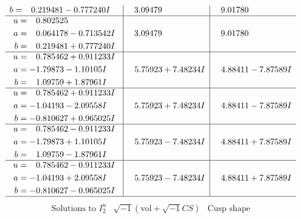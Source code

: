 \documentclass[1p]{elsarticle_modified}
\theoremstyle{definition}
\newcommand{\I}{\sqrt{-1}}
\begin{document}
$$\begin{array}{c|c|c}
\begin{aligned}
b &= \phantom{-}0.219481 - 0.777240 I\end{aligned}
 & \phantom{-}3.09479\phantom{ +0.000000I} & \phantom{-}9.01780\phantom{ +0.000000I} \\ \hline\begin{aligned}
u &= \phantom{-}0.802525\phantom{ +0.000000I} \\
a &= \phantom{-}0.064178 - 0.713542 I \\
b &= \phantom{-}0.219481 + 0.777240 I\end{aligned}
 & \phantom{-}3.09479\phantom{ +0.000000I} & \phantom{-}9.01780\phantom{ +0.000000I} \\ \hline\begin{aligned}
u &= \phantom{-}0.785462 + 0.911233 I \\
a &= -1.79873 - 1.10105 I \\
b &= \phantom{-}1.09759 + 1.87961 I\end{aligned}
 & \phantom{-}5.75923 + 7.48234 I & \phantom{-}4.88411 - 7.87589 I \\ \hline\begin{aligned}
u &= \phantom{-}0.785462 + 0.911233 I \\
a &= -1.04193 - 2.09558 I \\
b &= -0.810627 + 0.965025 I\end{aligned}
 & \phantom{-}5.75923 + 7.48234 I & \phantom{-}4.88411 - 7.87589 I \\ \hline\begin{aligned}
u &= \phantom{-}0.785462 - 0.911233 I \\
a &= -1.79873 + 1.10105 I \\
b &= \phantom{-}1.09759 - 1.87961 I\end{aligned}
 & \phantom{-}5.75923 - 7.48234 I & \phantom{-}4.88411 + 7.87589 I \\ \hline\begin{aligned}
u &= \phantom{-}0.785462 - 0.911233 I \\
a &= -1.04193 + 2.09558 I \\
b &= -0.810627 - 0.965025 I\end{aligned}
 & \phantom{-}5.75923 - 7.48234 I & \phantom{-}4.88411 + 7.87589 I\\
 \hline 
 \end{array}$$\newpage$$\begin{array}{c|c|c}  
\text{Solutions to }I^u_{2}& \I (\text{vol} + \sqrt{-1}CS) & \text{Cusp shape}\\
 \hline 
\begin{aligned}

\end{aligned}
\end{array}$$
\end{document}
